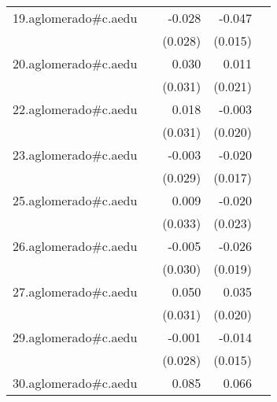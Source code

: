 {\begin{longtable}{l*{4}{D{.}{.}{-1}}}
\addlinespace
19.aglomerado#c.aedu&                     &      -0.028         &      -0.047\sym{**} &                     \\
            &                     &     (0.028)         &     (0.015)         &                     \\
\addlinespace
20.aglomerado#c.aedu&                     &       0.030         &       0.011         &                     \\
            &                     &     (0.031)         &     (0.021)         &                     \\
\addlinespace
22.aglomerado#c.aedu&                     &       0.018         &      -0.003         &                     \\
            &                     &     (0.031)         &     (0.020)         &                     \\
\addlinespace
23.aglomerado#c.aedu&                     &      -0.003         &      -0.020         &                     \\
            &                     &     (0.029)         &     (0.017)         &                     \\
\addlinespace
25.aglomerado#c.aedu&                     &       0.009         &      -0.020         &                     \\
            &                     &     (0.033)         &     (0.023)         &                     \\
\addlinespace
26.aglomerado#c.aedu&                     &      -0.005         &      -0.026         &                     \\
            &                     &     (0.030)         &     (0.019)         &                     \\
\addlinespace
27.aglomerado#c.aedu&                     &       0.050         &       0.035         &                     \\
            &                     &     (0.031)         &     (0.020)         &                     \\
\addlinespace
29.aglomerado#c.aedu&                     &      -0.001         &      -0.014         &                     \\
            &                     &     (0.028)         &     (0.015)         &                     \\
\addlinespace
30.aglomerado#c.aedu&                     &       0.085\sym{**} &       0.066\sym{**} &                     \\

\end{longtable}}
